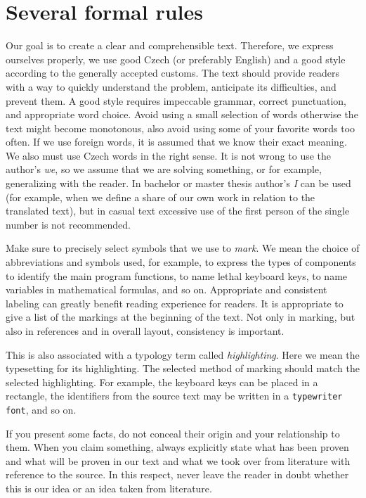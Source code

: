 \documentclass[english,odsaz]{fitthesis}
\begin{document}
\chapter{Several formal rules}
\label{sec-2}
Our goal is to create a clear and comprehensible text. Therefore, we express
ourselves properly, we use good Czech (or preferably English) and a good style
according to the generally accepted customs. The text should provide readers
with a way to quickly understand the problem, anticipate its difficulties, and
prevent them. A good style requires impeccable grammar, correct punctuation, and
appropriate word choice. Avoid using a small selection of words otherwise the
text might become monotonous, also avoid using some of your favorite words too
often. If we use foreign words, it is assumed that we know their exact
meaning. We also must use Czech words in the right sense. It is not wrong to use
the author's \emph{we}, so we assume that we are solving something, or for
example, generalizing with the reader. In bachelor or master thesis author's
\emph{I} can be used (for example, when we define a share of our own work in
relation to the translated text), but in casual text excessive use of the first
person of the single number is not recommended.

Make sure to precisely select symbols that we use to \emph{mark}. We mean the
choice of abbreviations and symbols used, for example, to express the types of
components to identify the main program functions, to name lethal keyboard keys,
to name variables in mathematical formulas, and so on. Appropriate and
consistent labeling can greatly benefit reading experience for readers. It is
appropriate to give a list of the markings at the beginning of the text. Not
only in marking, but also in references and in overall layout, consistency is
important.

This is also associated with a typology term called \emph{highlighting}. Here we mean
the typesetting for its highlighting. The selected method of marking should
match the selected highlighting. For example, the keyboard keys can be placed in
a rectangle, the identifiers from the source text may be written in a
\verb~typewriter font~, and so on.

If you present some facts, do not conceal their origin and your relationship to
them. When you claim something, always explicitly state what has been proven and
what will be proven in our text and what we took over from literature with
reference to the source. In this respect, never leave the reader in doubt
whether this is our idea or an idea taken from literature.
\end{document}
